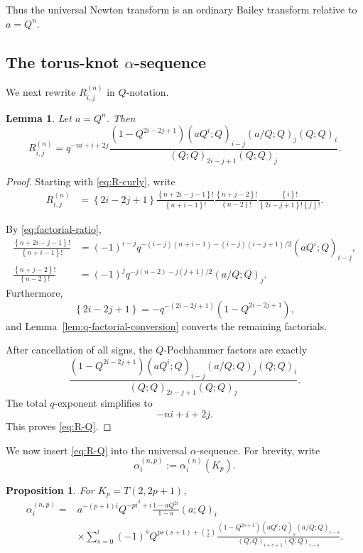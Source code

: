 \documentclass[11pt]{amsart}
\newtheorem{proposition}[theorem]{Proposition}
\newtheorem{lemma}[theorem]{Lemma}
\newcommand{\curly}[1]{\left\{#1\right\}}
\begin{document}
Thus the universal Newton transform is an ordinary Bailey transform
relative to \(a=Q^n\).


\subsection{The torus-knot \(\alpha\)-sequence}
\label{sec:torus-alpha}


We next rewrite \(R_{i,j}^{(n)}\) in \(Q\)-notation.

\begin{lemma}\label{lem:R-Q}
Let \(a=Q^n\).  Then
\begin{equation}\label{eq:R-Q}
R_{i,j}^{(n)}
=
q^{-ni+i+2j}
\frac{
(1-Q^{2i-2j+1})
(aQ^i;Q)_{i-j}
(a/Q;Q)_j
(Q;Q)_i
}{
(Q;Q)_{2i-j+1}
(Q;Q)_j
}.
\end{equation}
\end{lemma}

\begin{proof}
Starting with \eqref{eq:R-curly}, write
\begin{align*}
R_{i,j}^{(n)}
&=
\curly{2i-2j+1}
\frac{\curly{n+2i-j-1}!}{\curly{n+i-1}!}
\frac{\curly{n+j-2}!}{\curly{n-2}!}
\frac{\curly{i}!}{
\curly{2i-j+1}!\curly{j}!
}.
\end{align*}

By \eqref{eq:factorial-ratio},
\begin{align*}
\frac{\curly{n+2i-j-1}!}{\curly{n+i-1}!}
&=
(-1)^{i-j}
q^{-(i-j)(n+i-1)
-(i-j)(i-j+1)/2}
(aQ^i;Q)_{i-j},
\\
\frac{\curly{n+j-2}!}{\curly{n-2}!}
&=
(-1)^j
q^{-j(n-2)-j(j+1)/2}
(a/Q;Q)_j.
\end{align*}
Furthermore,
\[
\curly{2i-2j+1}
=
-q^{-(2i-2j+1)}
(1-Q^{2i-2j+1}),
\]
and Lemma~\ref{lem:q-factorial-conversion} converts the remaining
factorials.

After cancellation of all signs, the \(Q\)-Pochhammer factors are
exactly
\[
\frac{
(1-Q^{2i-2j+1})
(aQ^i;Q)_{i-j}
(a/Q;Q)_j
(Q;Q)_i
}{
(Q;Q)_{2i-j+1}
(Q;Q)_j
}.
\]
The total \(q\)-exponent simplifies to
\[
-ni+i+2j.
\]
This proves \eqref{eq:R-Q}.
\end{proof}

We now insert \eqref{eq:R-Q} into the universal \(\alpha\)-sequence. For brevity, write
\[
\alpha_i^{(n,p)}
:=
\alpha_i^{(n)}(K_p).
\]

\begin{proposition}\label{prop:torus-alpha}
For \(K_p=T(2,2p+1)\),
\begin{align}
\alpha_i^{(n,p)}
={}&
a^{-(p+1)i}
Q^{-pi^2+i}
\frac{1-aQ^{2i}}{1-a}
(a;Q)_i
\nonumber\\
&\times
\sum_{s=0}^{i}
(-1)^s
Q^{ps(s+1)+\binom{s}{2}}
\frac{
(1-Q^{2s+1})
(aQ^i;Q)_s
(a/Q;Q)_{i-s}
}{
(Q;Q)_{i+s+1}
(Q;Q)_{i-s}
}.
\label{eq:torus-alpha}
\end{align}
\end{proposition}
\end{document}
